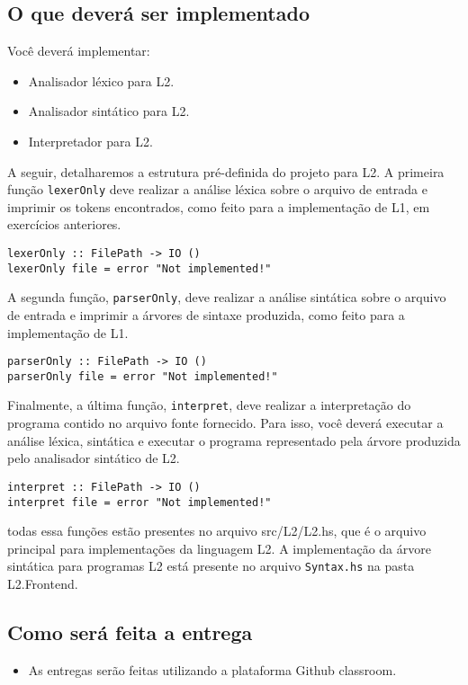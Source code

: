 \documentclass[a4paper,11pt]{article}
\begin{document}
\subsection*{O que deverá ser implementado}
\label{sec:org72d0591}

Você deverá implementar:

\begin{itemize}
\item Analisador léxico para L2.

\item Analisador sintático para L2.

\item Interpretador para L2.
\end{itemize}

A seguir, detalharemos a estrutura pré-definida do projeto para L2.
A primeira função \texttt{lexerOnly} deve realizar a análise léxica sobre o
arquivo de entrada e imprimir os tokens encontrados, como feito para a
implementação de L1, em exercícios anteriores.

\begin{verbatim}
lexerOnly :: FilePath -> IO ()
lexerOnly file = error "Not implemented!"
\end{verbatim}

A segunda função, \texttt{parserOnly}, deve realizar a análise sintática sobre o
arquivo de entrada e imprimir a árvores de sintaxe produzida, como feito para a
implementação de L1.

\begin{verbatim}
parserOnly :: FilePath -> IO ()
parserOnly file = error "Not implemented!"
\end{verbatim}

Finalmente, a última função, \texttt{interpret}, deve realizar a interpretação do programa
contido no arquivo fonte fornecido. Para isso, você deverá executar a análise léxica,
sintática e executar o programa representado pela árvore produzida pelo analisador
sintático de L2.

\begin{verbatim}
interpret :: FilePath -> IO ()
interpret file = error "Not implemented!"
\end{verbatim}

todas essa funções estão presentes no arquivo src/L2/L2.hs, que é o arquivo principal
para implementações da linguagem L2.
A implementação da árvore sintática para programas L2 está presente no arquivo \texttt{Syntax.hs}
na pasta L2.Frontend.
\subsection*{Como será feita a entrega}
\label{sec:orgfed70f8}

\begin{itemize}
\item As entregas serão feitas utilizando a plataforma Github classroom.
\end{itemize}
\end{document}
